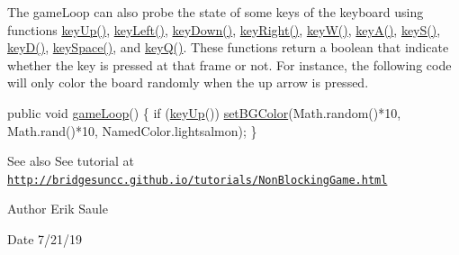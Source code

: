 The game\+Loop can also probe the state of some keys of the keyboard using functions \mbox{\hyperlink{classbridges_1_1games_1_1_non_blocking_game_a524c340fabec1b7a69aa742e1347b7b4}{key\+Up()}}, \mbox{\hyperlink{classbridges_1_1games_1_1_non_blocking_game_ac8b9a6d6d4074105af6d28995091bd2b}{key\+Left()}}, \mbox{\hyperlink{classbridges_1_1games_1_1_non_blocking_game_ac59c5ac18a456cc1d69ec8d42a311840}{key\+Down()}}, \mbox{\hyperlink{classbridges_1_1games_1_1_non_blocking_game_a5a3db63942e995409daaf6b89f88b203}{key\+Right()}}, \mbox{\hyperlink{classbridges_1_1games_1_1_non_blocking_game_a45db18869044968a233a6f217650e34d}{key\+W()}}, \mbox{\hyperlink{classbridges_1_1games_1_1_non_blocking_game_a4328a21ca65c26e11161dfe362770917}{key\+A()}}, \mbox{\hyperlink{classbridges_1_1games_1_1_non_blocking_game_a4beb82246ef1eaf8c13aa406632ab936}{key\+S()}}, \mbox{\hyperlink{classbridges_1_1games_1_1_non_blocking_game_a830a2e8127b042f8915deb61f0038f2a}{key\+D()}}, \mbox{\hyperlink{classbridges_1_1games_1_1_non_blocking_game_a4ff32a8ba8aeb3f438751729f7380d16}{key\+Space()}}, and \mbox{\hyperlink{classbridges_1_1games_1_1_non_blocking_game_a4075b3185f2fe0d20c9ed9957c448aee}{key\+Q()}}. These functions return a boolean that indicate whether the key is pressed at that frame or not. For instance, the following code will only color the board randomly when the up arrow is pressed.


\begin{DoxyCode}
\textcolor{keyword}{public} \textcolor{keywordtype}{void} \mbox{\hyperlink{classbridges_1_1games_1_1_game_base_a56d05ed744791cfc1c3792f39ff438f1}{gameLoop}}() \{
  \textcolor{keywordflow}{if} (\mbox{\hyperlink{classbridges_1_1games_1_1_non_blocking_game_a524c340fabec1b7a69aa742e1347b7b4}{keyUp}}())
    \mbox{\hyperlink{classbridges_1_1games_1_1_game_base_a7b4d08cdb306a5bf7104ab5315acb414}{setBGColor}}(Math.random()*10, Math.rand()*10, NamedColor.lightsalmon);
\}
\end{DoxyCode}


\begin{DoxySeeAlso}{See also}
See tutorial at \href{http://bridgesuncc.github.io/tutorials/NonBlockingGame.html}{\tt http\+://bridgesuncc.\+github.\+io/tutorials/\+Non\+Blocking\+Game.\+html}
\end{DoxySeeAlso}
\begin{DoxyAuthor}{Author}
Erik Saule 
\end{DoxyAuthor}
\begin{DoxyDate}{Date}
7/21/19 
\end{DoxyDate}
